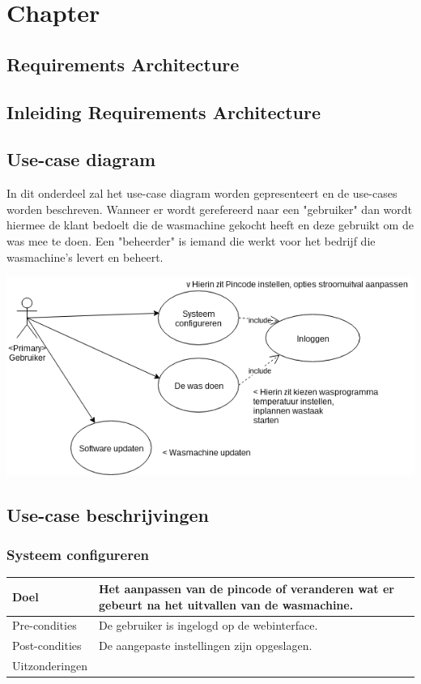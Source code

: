 \chapter{Chapter}
\section{Requirements Architecture}
\newpage

\section{Inleiding Requirements Architecture}

\section{Use-case diagram}
In dit onderdeel zal het use-case diagram worden gepresenteert en de use-cases worden beschreven.
Wanneer er wordt gerefereerd naar een "gebruiker" dan wordt hiermee de klant bedoelt die de wasmachine gekocht heeft en deze gebruikt om de was mee te doen.
Een "beheerder" is iemand die werkt voor het bedrijf die wasmachine's levert en beheert.

\scalebox{0.7} {
	\includegraphics{usage1.png}
}

\section{Use-case beschrijvingen}

	\subsection{Systeem configureren}
	\begin{center}
	  \begin{tabular}{ | p{4cm} | p{8.5cm} | }    \hline
		Doel & Het aanpassen van de pincode of veranderen wat er gebeurt na het uitvallen van de wasmachine. \\ \hline
		Pre-condities & De gebruiker is ingelogd op de webinterface. \\ \hline
		Post-condities & De aangepaste instellingen zijn opgeslagen. \\ \hline
		Uitzonderingen & \\
		\hline
	  \end{tabular}
	\end{center}

